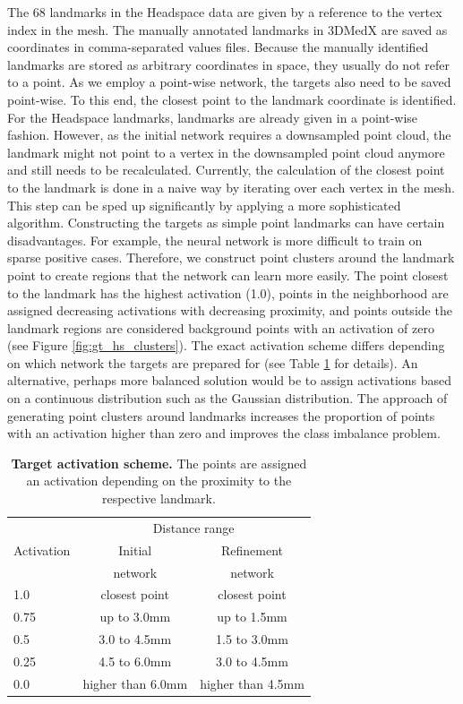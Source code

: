 \documentclass[class=article, crop=false]{standalone}
\begin{document}
The 68 landmarks in the Headspace data are given by a reference to the vertex index in the mesh. The manually annotated landmarks in 3DMedX are saved as coordinates in comma-separated values files. Because the manually identified landmarks are stored as arbitrary coordinates in space, they usually do not refer to a point. As we employ a point-wise network, the targets also need to be saved point-wise. To this end, the closest point to the landmark coordinate is identified. For the Headspace landmarks, landmarks are already given in a point-wise fashion. However, as the initial network requires a downsampled point cloud, the landmark might not point to a vertex in the downsampled point cloud anymore and still needs to be recalculated. Currently, the calculation of the closest point to the landmark is done in a naive way by iterating over each vertex in the mesh. This step can be sped up significantly by applying a more sophisticated algorithm. Constructing the targets as simple point landmarks can have certain disadvantages. For example, the neural network is more difficult to train on sparse positive cases. Therefore, we construct point clusters around the landmark point to create regions that the network can learn more easily. The point closest to the landmark has the highest activation (1.0), points in the neighborhood are assigned decreasing activations with decreasing proximity, and points outside the landmark regions are considered background points with an activation of zero (see Figure \ref{fig:gt_hs_clusters}). The exact activation scheme differs depending on which network the targets are prepared for (see Table \ref{tab:activation-scheme} for details). An alternative, perhaps more balanced solution would be to assign activations based on a continuous distribution such as the Gaussian distribution. The approach of generating point clusters around landmarks increases the proportion of points with an activation higher than zero and improves the class imbalance problem.

\begin{table}[]
\centering
\begin{tabular}[t]{lcc}\toprule
 & \multicolumn{2}{c}{Distance range} \\
\cmidrule(lr){2-3}
Activation & Initial & Refinement\\
& network & network\\
\hline
1.0        & closest point  & closest point    \\
0.75       & up to 3.0mm & up to 1.5mm    \\
0.5        & 3.0 to 4.5mm & 1.5 to 3.0mm   \\
0.25       & 4.5 to 6.0mm & 3.0 to 4.5mm  \\
0.0       & higher than 6.0mm & higher than 4.5mm  \\\bottomrule
\end{tabular}
\caption{\textbf{Target activation scheme.} The points are assigned an activation depending on the proximity to the respective landmark.}
\label{tab:activation-scheme}
\end{table}
\end{document}

